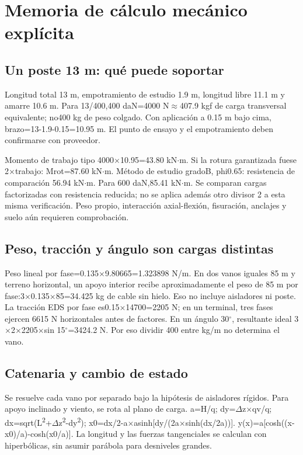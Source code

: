 \setcounter{section}{4}
\section{Memoria de cálculo mecánico explícita}
\setcounter{subsection}{0}
\subsection{Un poste 13 m: qué puede soportar}
Longitud total 13 m, empotramiento de estudio 1.9 m, longitud libre 11.1 m y amarre 10.6 m. Para 13/400,400 daN=4000 N\ensuremath{\approx}407.9 kgf de carga transversal equivalente; no400 kg de peso colgado. Con aplicación a 0.15 m bajo cima, brazo=13-1.9-0.15=10.95 m. El punto de ensayo y el empotramiento deben confirmarse con proveedor.

Momento de trabajo tipo 4000\ensuremath{\times}10.95=43.80 kN\ensuremath{\cdot}m. Si la rotura garantizada fuese 2\ensuremath{\times}trabajo: Mrot=87.60 kN\ensuremath{\cdot}m. Método de estudio gradoB, phi0.65: resistencia de comparación 56.94 kN\ensuremath{\cdot}m. Para 600 daN,85.41 kN\ensuremath{\cdot}m. Se comparan cargas factorizadas con resistencia reducida; no se aplica además otro divisor 2 a esta misma verificación. Peso propio, interacción axial-flexión, fisuración, anclajes y suelo aún requieren comprobación.

\setcounter{subsection}{1}
\subsection{Peso, tracción y ángulo son cargas distintas}
Peso lineal por fase=0.135\ensuremath{\times}9.80665=1.323898 N/m. En dos vanos iguales 85 m y terreno horizontal, un apoyo interior recibe aproximadamente el peso de 85 m por fase:3\ensuremath{\times}0.135\ensuremath{\times}85=34.425 kg de cable sin hielo. Eso no incluye aisladores ni poste. La tracción EDS por fase es0.15\ensuremath{\times}14700=2205 N; en un terminal, tres fases ejercen 6615 N horizontales antes de factores. En un ángulo 30\ensuremath{^\circ}, resultante ideal 3\ensuremath{\times}2\ensuremath{\times}2205\ensuremath{\times}sin 15\ensuremath{^\circ}=3424.2 N. Por eso dividir 400 entre kg/m no determina el vano.

\setcounter{subsection}{2}
\subsection{Catenaria y cambio de estado}
Se resuelve cada vano por separado bajo la hipótesis de aisladores rígidos. Para apoyo inclinado y viento, se rota al plano de carga. a=H/q; dy=\ensuremath{\Delta}z\ensuremath{\times}qv/q; dx=sqrt(L\textsuperscript{2}+\ensuremath{\Delta}z\textsuperscript{2}-dy\textsuperscript{2}); x0=dx/2-a\ensuremath{\times}asinh[dy/(2a\ensuremath{\times}sinh(dx/2a))]. y(x)=a[cosh((x-x0)/a)-cosh(x0/a)]. La longitud y las fuerzas tangenciales se calculan con hiperbólicas, sin asumir parábola para desniveles grandes.

